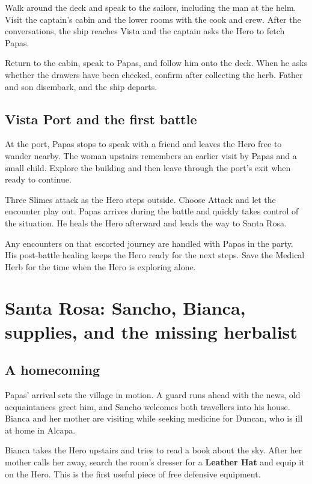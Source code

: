 Walk around the deck and speak to the sailors, including the man at the
helm. Visit the captain's cabin and the lower rooms with the cook and
crew. After the conversations, the ship reaches Vista and the captain
asks the Hero to fetch Papas.

Return to the cabin, speak to Papas, and follow him onto the deck.
When he asks whether the drawers have been checked, confirm after collecting
the herb. Father and son disembark, and the ship departs.

\subsection*{Vista Port and the first battle}

At the port, Papas stops to speak with a friend and leaves the Hero free
to wander nearby. The woman upstairs remembers an earlier visit by Papas
and a small child. Explore the building and then leave through the port's
exit when ready to continue.

Three Slimes attack as the Hero steps outside. Choose Attack and let the
encounter play out. Papas arrives during the battle and quickly takes
control of the situation. He heals the Hero afterward and leads the way
to Santa Rosa.

Any encounters on that escorted journey are handled with Papas in the
party. His post-battle healing keeps the Hero ready for the next steps.
Save the Medical Herb for the time when the Hero is exploring alone.

\section{Santa Rosa: Sancho, Bianca, supplies, and the missing herbalist}

\subsection*{A homecoming}

Papas' arrival sets the village in motion. A guard runs ahead with the
news, old acquaintances greet him, and Sancho welcomes both travellers
into his house. Bianca and her mother are visiting while seeking medicine
for Duncan, who is ill at home in Alcapa.

Bianca takes the Hero upstairs and tries to read a book about the sky.
After her mother calls her away, search the room's dresser for a
\textbf{Leather Hat} and equip it on the Hero. This is the first useful
piece of free defensive equipment.

